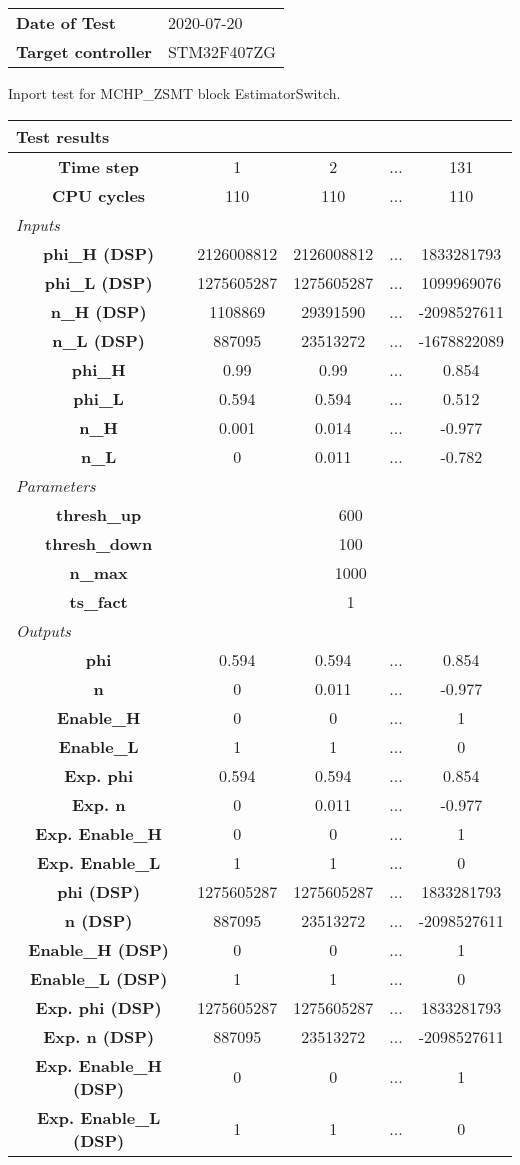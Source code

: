 \begin{tabular}{l l}
\textbf{Date of Test} & 2020-07-20 \tabularnewline
\textbf{Target controller} & STM32F407ZG \tabularnewline
\end{tabular}
\vspace{1ex}
Inport test for MCHP_ZSMT block EstimatorSwitch.

\vspace{1em}
\begin{tabularx}{\textwidth}{|c|c|c|>{\centering\arraybackslash}X|c|}
\hline
\multicolumn{5}{|l|}{\cellcolor[gray]{0.8}\textbf{Test results}} \tabularnewline \hline
\textbf{Time step} & 1 & 2 & ... & 131 \tabularnewline \hline
\textbf{CPU cycles} & 110 & 110 & ... & 110 \tabularnewline \hline
\multicolumn{5}{|l|}{\cellcolor[gray]{0.9}\textit{Inputs}} \tabularnewline \hline
\textbf{phi\_H (DSP)} & 2126008812 & 2126008812 & ... & 1833281793 \tabularnewline \hline
\textbf{phi\_L (DSP)} & 1275605287 & 1275605287 & ... & 1099969076 \tabularnewline \hline
\textbf{n\_H (DSP)} & 1108869 & 29391590 & ... & -2098527611 \tabularnewline \hline
\textbf{n\_L (DSP)} & 887095 & 23513272 & ... & -1678822089 \tabularnewline \hline
\textbf{phi\_H} & 0.99 & 0.99 & ... & 0.854 \tabularnewline \hline
\textbf{phi\_L} & 0.594 & 0.594 & ... & 0.512 \tabularnewline \hline
\textbf{n\_H} & 0.001 & 0.014 & ... & -0.977 \tabularnewline \hline
\textbf{n\_L} & 0 & 0.011 & ... & -0.782 \tabularnewline \hline
\multicolumn{5}{|l|}{\cellcolor[gray]{0.9}\textit{Parameters}} \tabularnewline \hline
\textbf{thresh\_up} & \multicolumn{4}{c|}{600} \tabularnewline \hline
\textbf{thresh\_down} & \multicolumn{4}{c|}{100} \tabularnewline \hline
\textbf{n\_max} & \multicolumn{4}{c|}{1000} \tabularnewline \hline
\textbf{ts\_fact} & \multicolumn{4}{c|}{1} \tabularnewline \hline
\multicolumn{5}{|l|}{\cellcolor[gray]{0.9}\textit{Outputs}} \tabularnewline \hline
\textbf{phi} & 0.594 & 0.594 & ... & 0.854 \tabularnewline \hline
\textbf{n} & 0 & 0.011 & ... & -0.977 \tabularnewline \hline
\textbf{Enable\_H} & 0 & 0 & ... & 1 \tabularnewline \hline
\textbf{Enable\_L} & 1 & 1 & ... & 0 \tabularnewline \hline
\textbf{Exp. phi} & 0.594 & 0.594 & ... & 0.854 \tabularnewline \hline
\textbf{Exp. n} & 0 & 0.011 & ... & -0.977 \tabularnewline \hline
\textbf{Exp. Enable\_H} & 0 & 0 & ... & 1 \tabularnewline \hline
\textbf{Exp. Enable\_L} & 1 & 1 & ... & 0 \tabularnewline \hline
\textbf{phi (DSP)} & 1275605287 & 1275605287 & ... & 1833281793 \tabularnewline \hline
\textbf{n (DSP)} & 887095 & 23513272 & ... & -2098527611 \tabularnewline \hline
\textbf{Enable\_H (DSP)} & 0 & 0 & ... & 1 \tabularnewline \hline
\textbf{Enable\_L (DSP)} & 1 & 1 & ... & 0 \tabularnewline \hline
\textbf{Exp. phi (DSP)} & 1275605287 & 1275605287 & ... & 1833281793 \tabularnewline \hline
\textbf{Exp. n (DSP)} & 887095 & 23513272 & ... & -2098527611 \tabularnewline \hline
\textbf{Exp. Enable\_H (DSP)} & 0 & 0 & ... & 1 \tabularnewline \hline
\textbf{Exp. Enable\_L (DSP)} & 1 & 1 & ... & 0 \tabularnewline \hline
\end{tabularx}
\vspace{1ex}

